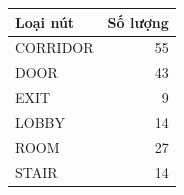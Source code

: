 \begin{center}\small
\begin{tabular}{lr}
\toprule
Loại nút & Số lượng\\\midrule
CORRIDOR & 55\\
DOOR & 43\\
EXIT & 9\\
LOBBY & 14\\
ROOM & 27\\
STAIR & 14\\
\bottomrule\end{tabular}\end{center}